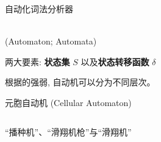 
\begin{frame}{}
  \begin{center}
    自动化词法分析器
  \end{center}
\end{frame}

\begin{frame}{}
  \begin{center}
     \\[5pt]
    (Automaton; Automata)


    \vspace{0.50cm}
    两大要素: {\bf 状态集} $S$ 以及{\bf 状态转移函数} $\delta$
  \end{center}
\end{frame}

\begin{frame}{}
  \begin{center}

    \vspace{0.50cm}
    根据的强弱, 自动机可以分为不同层次。
  \end{center}
\end{frame}

\begin{frame}{}
  \begin{center}
    元胞自动机 (Cellular Automaton)
  \end{center}

  \vspace{0.30cm}
  \begin{columns}
      \begin{center}
        ``播种机''、``滑翔机枪''与``滑翔机''
      \end{center}
      \begin{center}
         \\[3pt]
      \end{center}
  \end{columns}
\end{frame}

